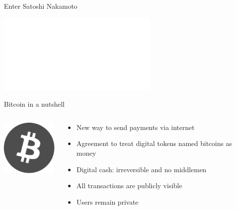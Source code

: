 \documentclass[12pt, usepdftitle=false]{beamer}
\begin{document}
\begin{frame}{Enter Satoshi Nakamoto}

\begin{center}
\includegraphics<1>[width=.5\textwidth]{satoshi.pdf}
\end{center}
	
\end{frame}


\begin{frame}{Bitcoin in a nutshell}
\begin{columns}[c]
\begin{column}{.3\textwidth}
\includegraphics[width=\textwidth]{logo-grey}
\end{column}
\begin{column}{.7\textwidth}
\begin{itemize}
	\item New way to send payments via internet\pause
	\item Agreement to treat digital tokens named \alert{bitcoins} as money\pause
	\item Digital cash: irreversible and no middlemen\pause
	\item All transactions are publicly visible\pause
	\item Users remain private
\end{itemize}
\end{column}
\end{columns}
\end{frame}
\end{document}
